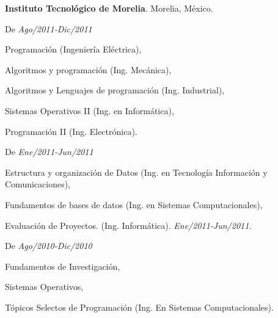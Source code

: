 \documentclass[10pt]{article}
\newenvironment{innerlist}[1][\enskip\textbullet]%
        {\begin{compactitem}[#1]}{\end{compactitem}}
\newcommand{\blankline}{\quad\pagebreak[2]}
\begin{document}
\blankline


\textbf{Instituto Tecnológico de Morelia}. Morelia, México.

\begin{innerlist}
\item[De  \textit{Ago/2011-Dic/2011}  ]
\item Programación (Ingeniería Eléctrica), 
\item Algoritmos y programación (Ing. Mecánica), 
\item Algoritmos y Lenguajes de programación (Ing. Industrial), 
\item Sistemas Operativos II (Ing. en Informática), 
\item Programación II (Ing. Electrónica). 
\item[]
\item[ De \textit{Ene/2011-Jun/2011}]

\item Estructura y organización de Datos (Ing. en Tecnología Información y Comunicaciones), 
\item Fundamentos de bases de datos (Ing. en Sistemas Computacionales), 
\item Evaluación de Proyectos. (Ing. Informática). \textit{Ene/2011-Jun/2011}.
\item[]
\item[ De \textit{Ago/2010-Dic/2010}]

\item Fundamentos de Investigación, 
\item Sistemas Operativos, 
\item Tópicos Selectos de Programación (Ing. En Sistemas Computacionales).  

\end{innerlist}
\end{document}
